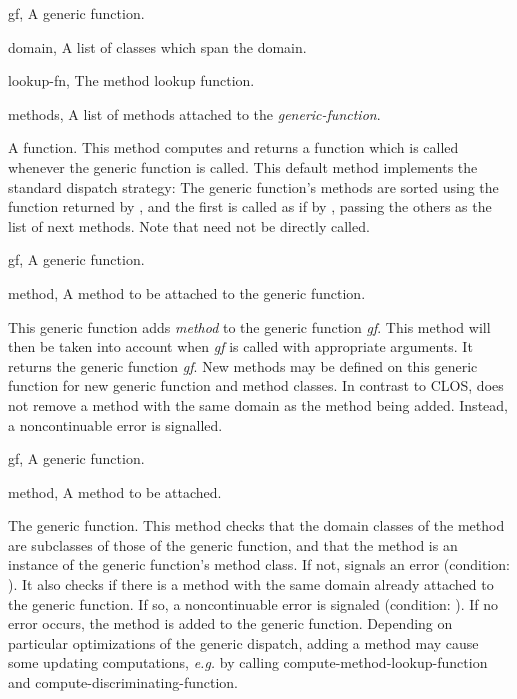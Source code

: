 \begin{optDefinition}
%
\begin{specargs}
    \item[gf, \classref{generic-function}] A generic function.
    \item[domain, \classref{list}] A list of classes which span the domain.
    \item[lookup-fn, \classref{function}] The method lookup function.
    \item[methods, \classref{list}] A list of methods attached to the {\em
        generic-function}.
\end{specargs}
%
\result%
A function.
%
\remarks%
This method computes and returns a function which is called whenever
the generic function is called.  This default method implements the
standard dispatch strategy:  The generic function's methods are sorted
using the function returned by ,
and the first is called as if by , passing the others
as the list of next methods.  Note that  need not be
directly called.

%
\begin{genericargs}
    \item[gf, \classref{generic-function}] A generic function.
    \item[method, \classref{method}] A method to be attached to the generic
    function.
\end{genericargs}
%
\result%
This generic function adds {\em method} to the generic function {\em
gf}.  This method will then be taken into account when {\em gf} is
called with appropriate arguments.  It returns the generic function
{\em gf}.  New methods may be defined on this generic function for new
generic function and method classes.
%
\remarks%
In contrast to CLOS,  does not remove a method with
the same domain as the method being added. Instead, a noncontinuable
error is signalled.

%
\begin{specargs}
    \item[gf, \classref{generic-function}] A generic function.
    \item[method, \classref{method}] A method to be attached.
\end{specargs}
%
\result%
The generic function.
%
\remarks%
This method checks that the domain classes of the method are subclasses of those
of the generic function, and that the method is an instance of the generic
function's method class.  If not, signals an error (condition:
).  It also checks if there is a
method with the same domain already attached to the generic function.  If so, a
noncontinuable error is signaled (condition: 
). If no error occurs, the method is added
to the generic function.  Depending on particular optimizations of the generic
dispatch, adding a method may cause some updating computations, {\em e.g.} by
calling compute-method-lookup-function and compute-discriminating-function.
%
\end{optDefinition}
